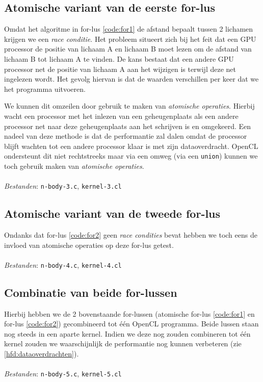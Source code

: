 \documentclass{article}
\begin{document}
\subsection{Atomische variant van de eerste for-lus}
\label{hfd:atomisch-for1}
Omdat het algoritme in for-lus \ref{code:for1} de afstand bepaalt
tussen 2 lichamen krijgen we een \textit{race conditie}. Het probleem situeert
zich bij het feit dat een GPU processor de positie van lichaam A en lichaam B moet
lezen om de afstand van lichaam B tot lichaam A te vinden. De kans bestaat dat een
andere GPU processor net de positie van lichaam A aan het wijzigen is terwijl deze
net ingelezen wordt. Het gevolg hiervan is dat de waarden verschillen per keer dat
we het programma uitvoeren.

We kunnen dit omzeilen door gebruik te maken van \textit{atomische operaties}.
Hierbij wacht een processor met het inlezen van een geheugenplaats als een andere
processor net naar deze geheugenplaats aan het schrijven is en omgekeerd. Een
nadeel van deze methode is dat de performantie zal dalen omdat de processor blijft
wachten tot een andere processor klaar is met zijn dataoverdracht. OpenCL ondersteunt
dit niet rechtstreeks maar via een omweg (via een \texttt{union}) kunnen we toch
gebruik maken van \textit{atomische operaties}.
\\
\\
\textit{Bestanden}: \texttt{n-body-3.c}, \texttt{kernel-3.cl}

\subsection{Atomische variant van de tweede for-lus}
\label{hfd:atomisch-for2}
Ondanks dat for-lus \ref{code:for2} geen \textit{race condities} bevat hebben we
toch eens de invloed van atomische operaties op deze for-lus getest.
\\
\\
\textit{Bestanden}: \texttt{n-body-4.c}, \texttt{kernel-4.cl}

\subsection{Combinatie van beide for-lussen}
\label{hfd:combinatie-lussen}
Hierbij hebben we de 2 bovenstaande for-lussen (atomische for-lus \ref{code:for1} en for-lus \ref{code:for2}) gecombineerd tot \'{e}\'{e}n
OpenCL programma. Beide lussen staan nog steeds in een aparte kernel. Indien we
deze nog zouden combineren tot \'{e}\'{e}n kernel zouden we waarschijnlijk de
performantie nog kunnen verbeteren (zie \ref{hfd:dataoverdrachten}).
\\
\\
\textit{Bestanden}: \texttt{n-body-5.c}, \texttt{kernel-5.cl}
\end{document}
